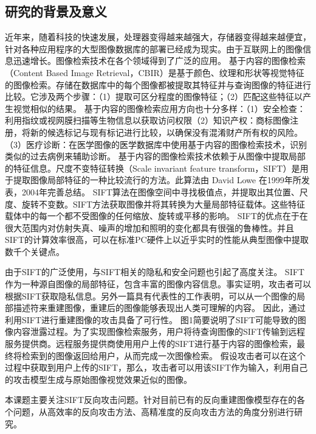 \subsection{研究的背景及意义}
近年来，随着科技的快速发展，处理器变得越来越强大，存储器变得越来越便宜，针对各种应用程序的大型图像数据库的部署已经成为现实。由于互联网上的图像信息迅速增长。图像检索技术在各个领域得到了广泛的应用。
基于内容的图像检索（Content Based Image Retrieval，CBIR）\cite{2015Content}是基于颜色、纹理和形状等视觉特征的图像检索。存储在数据库中的每个图像都被提取其特征并与查询图像的特征进行比较。它涉及两个步骤：（1）提取可区分程度的图像特征；（2）匹配这些特征以产生视觉相似的结果。
基于内容的图像检索应用方向也十分多样：（1）安全检查：利用指纹或视网膜扫描等生物信息以获取访问权限（2）知识产权：商标图像注册，将新的候选标记与现有标记进行比较，以确保没有混淆财产所有权的风险。（3）医疗诊断：在医学图像的医学数据库中使用基于内容的图像检索技术，识别类似的过去病例来辅助诊断。
基于内容的图像检索技术依赖于从图像中提取局部的特征信息。尺度不变特征转换（Scale invariant feature transform，SIFT）\cite{loweDistinctiveImageFeatures2004}是用于提取图像局部特征的一种比较流行的方法。此算法由 David Lowe 在1999年所发表，2004年完善总结。
SIFT算法在图像空间中寻找极值点，并提取出其位置、尺度、旋转不变数。SIFT方法获取图像并将其转换为大量局部特征载体。这些特征载体中的每一个都不受图像的任何缩放、旋转或平移的影响。
SIFT的优点在于在很大范围内对仿射失真、噪声的增加和照明的变化都具有很强的鲁棒性。并且SIFT的计算效率很高，可以在标准PC硬件上以近乎实时的性能从典型图像中提取数千个关键点。
\par
由于SIFT的广泛使用，与SIFT相关的隐私和安全问题也引起了高度关注\cite{9762698}\cite{Qin2014TowardsEP}。
SIFT作为一种源自图像的局部特征，包含丰富的图像内容信息\cite{10214250}。事实证明，攻击者可以根据SIFT获取隐私信息\cite{10.1145/3386082}。另外一篇具有代表性的工作\cite{5995616}表明，可以从一个图像的局部描述符来重建图像，重建后的图像能够表现出人类可理解的内容。
因此，通过利用SIFT进行重建图像的攻击具备了可行性。
图1简要说明了SIFT可能导致的图像内容泄露过程。为了实现图像检索服务，用户将待查询图像的SIFT传输到远程服务提供商。远程服务提供商使用用户上传的SIFT进行基于内容的图像检索，最终将检索到的图像返回给用户，从而完成一次图像检索。
假设攻击者可以在这个过程中获取到用户上传的SIFT，那么，攻击者可以用该SIFT作为输入，利用自己的攻击模型生成与原始图像视觉效果近似的图像\cite{10.1145/3599589.3599596}\cite{SUN2020102642}。
\par
本课题主要关注SIFT反向攻击问题。针对目前已有的反向重建图像模型存在的各个问题，从高效率的反向攻击方法、高精准度的反向攻击方法的角度分别进行研究。
